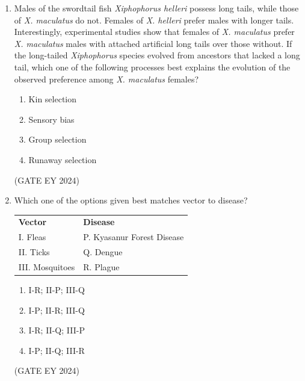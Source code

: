 \documentclass[journal]{IEEEtran}
\begin{document}
\begin{enumerate}
\item Males of the swordtail fish \textit{Xiphophorus helleri} possess long tails, while those of \textit{X. maculatus} do not. Females of \textit{X. helleri} prefer males with longer tails. Interestingly, experimental studies show that females of \textit{X. maculatus} prefer \textit{X. maculatus} males with attached artificial long tails over those without. If the long-tailed \textit{Xiphophorus} species evolved from ancestors that lacked a long tail, which one of the following processes best explains the evolution of the observed preference among \textit{X. maculatus} females?
    \begin{multicols}{2}
    \begin{enumerate}
        \item Kin selection
        \item Sensory bias
        \item Group selection
        \item Runaway selection
    \end{enumerate}
    \end{multicols}
\hfill{(GATE EY 2024)}

\item Which one of the options given best matches vector to disease? \\
\begin{tabular}{ll}
\textbf{Vector} & \textbf{Disease} \\
I. Fleas & P. Kyasanur Forest Disease \\
II. Ticks & Q. Dengue \\
III. Mosquitoes & R. Plague \\
\end{tabular}
    \begin{multicols}{2}
    \begin{enumerate}
        \item I-R; II-P; III-Q
        \item I-P; II-R; III-Q
        \item I-R; II-Q; III-P
        \item I-P; II-Q; III-R
    \end{enumerate}
    \end{multicols}
\hfill{(GATE EY 2024)}


\end{enumerate}
\end{document}
